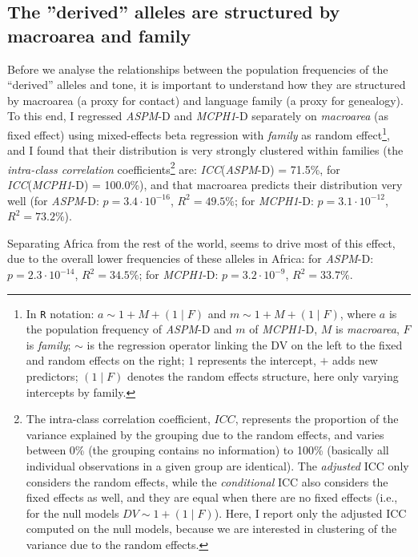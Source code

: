 \documentclass[twoside,twocolumn]{article}
\begin{document}
\subsection{The ''derived'' alleles are structured by macroarea and family}

Before we analyse the relationships between the population frequencies of the ``derived'' alleles and tone, it is important to understand how they are structured by macroarea (a proxy for contact) and language family (a proxy for genealogy).
To this end, I regressed \textit{ASPM}-D and \textit{MCPH1}-D separately on \textit{macroarea} (as fixed effect) using mixed-effects beta regression with \textit{family} as random effect\footnote{\label{note_reg_R}In \texttt{R} notation: $a \sim 1 + M + (1 \mid F)$ and $m \sim 1 + M + (1 \mid F)$, where $a$ is the population frequency of \textit{ASPM}-D and $m$ of \textit{MCPH1}-D, $M$ is \textit{macroarea}, $F$ is \textit{family}; $\sim$ is the regression operator linking the DV on the left to the fixed and random effects on the right; $1$ represents the intercept, $+$ adds new predictors; $(1 \mid F)$ denotes the random effects structure, here only varying intercepts by family.},
and I found that their distribution is very strongly clustered within families (the \emph{intra-class correlation} coefficients\footnote{The intra-class correlation coefficient, $ICC$, represents the proportion of the variance explained by the grouping due to the random effects, and varies between 0\% (the grouping contains no information) to 100\% (basically all individual observations in a given group are identical). The \emph{adjusted} ICC only considers the random effects, while the \emph{conditional} ICC also considers the fixed effects as well, and they are equal when there are no fixed effects (i.e., for the null models $DV \sim 1 + (1 \mid F)$). Here, I report only the adjusted ICC computed on the null models, because we are interested in clustering of the variance due to the random effects.} are: \textit{ICC}(\textit{ASPM}-D) = 71.5\%, for \textit{ICC}(\textit{MCPH1}-D) = 100.0\%),
and that macroarea predicts their distribution very well (for \textit{ASPM}-D: $p = 3.4\cdot10^{-16}$, $R^2 = 49.5\%$; for \textit{MCPH1}-D: $p = 3.1\cdot10^{-12}$, $R^2 = 73.2\%$).

Separating Africa from the rest of the world, seems to drive most of this effect, due to the overall lower frequencies of these alleles in Africa: for \textit{ASPM}-D: $p = 2.3\cdot10^{-14}$, $R^2 = 34.5\%$; for \textit{MCPH1}-D: $p = 3.2\cdot10^{-9}$, $R^2 = 33.7\%$.
\end{document}
